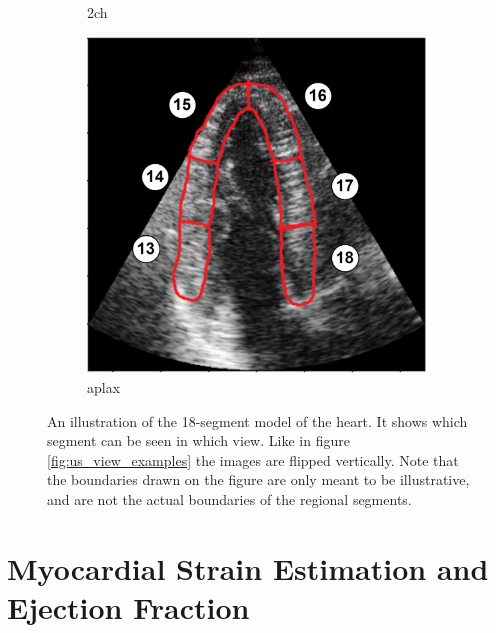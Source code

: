 \begin{figure}[H]
\begin{subfigure}[b]{0.3\textwidth}
        \caption{\acrshort{2ch}}
        \label{fig:18_segment_model_2ch}
    \end{subfigure}
    \begin{subfigure}[b]{0.3\textwidth}
        \includegraphics[width=0.99\textwidth]{echocardiography/aplax_frame_segmented.png}
        \caption{\acrshort{aplax}}
        \label{fig:18_segment_model_aplax}
    \end{subfigure}
    \caption{An illustration of the 18-segment model of the heart. It shows which segment can be seen in which view. Like in figure \ref{fig:us_view_examples} the images are flipped vertically. Note that the boundaries drawn on the figure are only meant to be illustrative, and are not the actual boundaries of the regional segments.}
    \label{fig:18_segment_model}
\end{figure}

\section{Myocardial Strain Estimation and Ejection Fraction}

